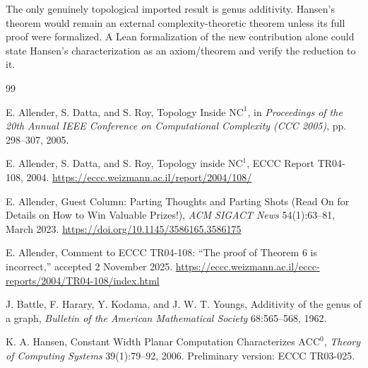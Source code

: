 \documentclass[11pt]{article}
\theoremstyle{definition}
\begin{document}
The only genuinely topological imported result is genus additivity. Hansen's theorem would remain an external complexity-theoretic theorem unless its full proof were formalized. A Lean formalization of the new contribution alone could state Hansen's characterization as an axiom/theorem and verify the reduction to it.

\begin{thebibliography}{99}

E. Allender, S. Datta, and S. Roy,
\newblock Topology Inside $\mathrm{NC}^1$,
\newblock in \emph{Proceedings of the 20th Annual IEEE Conference on Computational Complexity (CCC 2005)}, pp. 298--307, 2005.

E. Allender, S. Datta, and S. Roy,
\newblock Topology inside $\mathrm{NC}^1$,
\newblock ECCC Report TR04-108, 2004.
\newblock \url{https://eccc.weizmann.ac.il/report/2004/108/}

E. Allender,
\newblock Guest Column: Parting Thoughts and Parting Shots (Read On for Details on How to Win Valuable Prizes!),
\newblock \emph{ACM SIGACT News} 54(1):63--81, March 2023.
\newblock \url{https://doi.org/10.1145/3586165.3586175}

E. Allender,
\newblock Comment to ECCC TR04-108: ``The proof of Theorem 6 is incorrect,''
\newblock accepted 2 November 2025.
\newblock \url{https://eccc.weizmann.ac.il/eccc-reports/2004/TR04-108/index.html}

J. Battle, F. Harary, Y. Kodama, and J. W. T. Youngs,
\newblock Additivity of the genus of a graph,
\newblock \emph{Bulletin of the American Mathematical Society} 68:565--568, 1962.

K. A. Hansen,
\newblock Constant Width Planar Computation Characterizes $\mathrm{ACC}^0$,
\newblock \emph{Theory of Computing Systems} 39(1):79--92, 2006.
\newblock Preliminary version: ECCC TR03-025.

\end{thebibliography}
\end{document}
